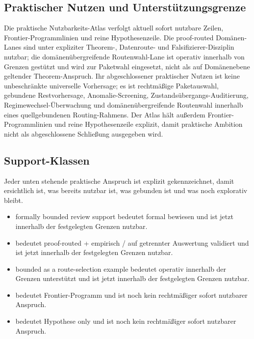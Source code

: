\subsection{Praktischer Nutzen und Unterstützungsgrenze}
Die praktische Nutzbarkeits-Atlas verfolgt aktuell  sofort nutzbare Zeilen,  Frontier-Programmlinien und  reine Hypothesenzeile.
Die proof-routed Domänen-Lanes sind unter expliziter Theorem-, Datenroute- und Falsifizierer-Disziplin nutzbar; die domänenübergreifende Routenwahl-Lane ist operativ innerhalb von Grenzen gestützt und wird zur Paketwahl eingesetzt, nicht als auf Domänenebene geltender Theorem-Anspruch.
Ihr abgeschlossener praktischer Nutzen ist keine unbeschränkte universelle Vorhersage; es ist rechtmäßige Paketauswahl, gebundene Restvorhersage, Anomalie-Screening, Zustandsübergangs-Auditierung, Regimewechsel-Überwachung und domänenübergreifende Routenwahl innerhalb eines quellgebundenen Routing-Rahmens.
Der Atlas hält außerdem  Frontier-Programmlinien und  reine Hypothesenzeile explizit, damit praktische Ambition nicht als abgeschlossene Schließung ausgegeben wird.

\subsection{Support-Klassen}
Jeder unten stehende praktische Anspruch ist explizit gekennzeichnet, damit ersichtlich ist, was bereits nutzbar ist, was gebunden ist und was noch explorativ bleibt.
\begin{itemize}[leftmargin=1.6em,nosep]
\item formally bounded review support bedeutet formal bewiesen und ist jetzt innerhalb der festgelegten Grenzen nutzbar.
\item {} bedeutet proof-routed + empirisch / auf getrennter Auswertung validiert und ist jetzt innerhalb der festgelegten Grenzen nutzbar.
\item bounded as a route-selection example bedeutet operativ innerhalb der Grenzen unterstützt und ist jetzt innerhalb der festgelegten Grenzen nutzbar.
\item {} bedeutet Frontier-Programm und ist noch kein rechtmäßiger sofort nutzbarer Anspruch.
\item {} bedeutet Hypothese only und ist noch kein rechtmäßiger sofort nutzbarer Anspruch.
\end{itemize}

